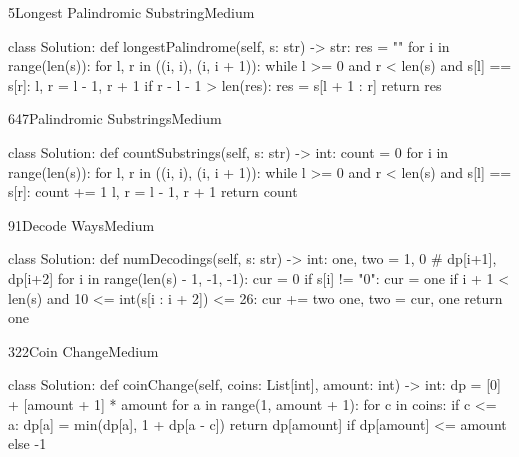 \begin{problem}{5}{Longest Palindromic Substring}{Medium}
\begin{code}
class Solution:
    def longestPalindrome(self, s: str) -> str:
        res = ""
        for i in range(len(s)):
            for l, r in ((i, i), (i, i + 1)):
                while l >= 0 and r < len(s) and s[l] == s[r]:
                    l, r = l - 1, r + 1
                if r - l - 1 > len(res):
                    res = s[l + 1 : r]
        return res
\end{code}
\end{problem}

\begin{problem}{647}{Palindromic Substrings}{Medium}
\begin{code}
class Solution:
    def countSubstrings(self, s: str) -> int:
        count = 0
        for i in range(len(s)):
            for l, r in ((i, i), (i, i + 1)):
                while l >= 0 and r < len(s) and s[l] == s[r]:
                    count += 1
                    l, r = l - 1, r + 1
        return count
\end{code}
\end{problem}

\begin{problem}{91}{Decode Ways}{Medium}
\begin{code}
class Solution:
    def numDecodings(self, s: str) -> int:
        one, two = 1, 0                   # dp[i+1], dp[i+2]
        for i in range(len(s) - 1, -1, -1):
            cur = 0
            if s[i] != "0":
                cur = one
                if i + 1 < len(s) and 10 <= int(s[i : i + 2]) <= 26:
                    cur += two
            one, two = cur, one
        return one
\end{code}
\end{problem}

\begin{problem}{322}{Coin Change}{Medium}
\begin{code}
class Solution:
    def coinChange(self, coins: List[int], amount: int) -> int:
        dp = [0] + [amount + 1] * amount
        for a in range(1, amount + 1):
            for c in coins:
                if c <= a:
                    dp[a] = min(dp[a], 1 + dp[a - c])
        return dp[amount] if dp[amount] <= amount else -1
\end{code}
\end{problem}

